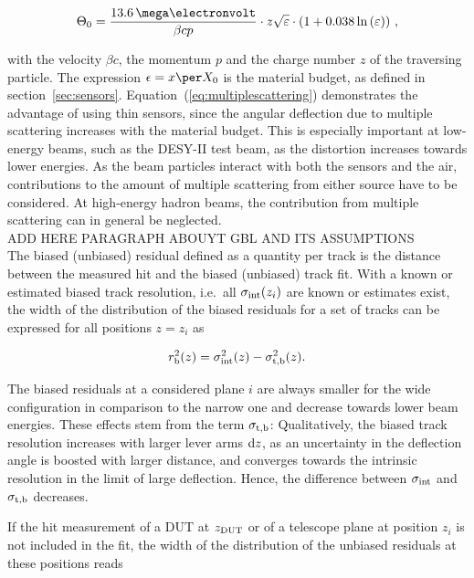 \begin{equation}
\label{eq:multiplescattering}
\Theta_{0} = \frac{13.6\,\mega\electronvolt}{\beta c p} \cdot z
\sqrt{\varepsilon}
\cdot \left( 1 + 0.038 \ln{\left( \varepsilon \right) } \right) \,,
\end{equation}

\noindent with the velocity $\beta c$, the momentum $p$ and the charge number $z$ of the traversing particle. 
The expression $\epsilon = x \per X_0$ is the material budget, as defined in section~\ref{sec:sensors}.
Equation~(\ref{eq:multiplescattering}) demonstrates the advantage of using thin sensors, since the angular deflection due to multiple scattering increases with the material budget.
This is especially important at low-energy beams, such as the DESY-II test beam, as the distortion increases towards lower energies.
As the beam particles interact with both the sensors and the air, contributions to the amount of multiple scattering from either source have to be considered.
At high-energy hadron beams, the contribution from multiple scattering can in general be neglected. \\

ADD HERE PARAGRAPH ABOUYT GBL AND ITS ASSUMPTIONS\\

The biased (unbiased) residual defined as a quantity per track is the distance between the measured hit and the biased (unbiased) track fit. 
With a known or estimated biased track resolution, i.e.\ all $\sigma_{\textrm{int}}(z_i)$ are known or estimates exist,
 the width of the distribution of the biased residuals for a set of tracks can be expressed for all positions $z = z_i$ as

\begin{equation}
 \label{eq:telescoperesolutionequation1}
 r_{\textrm{b}}^2(z) = \sigma_{\textrm{int}}^2(z) - \sigma_{\textrm{t,b}}^2(z).
\end{equation}

\noindent
The biased residuals at a considered plane $i$ are always smaller for the wide configuration in comparison to the narrow one and decrease towards lower beam energies. 
These effects stem from the term $\sigma_{\textrm{t,b}}$: 
Qualitatively, the biased track resolution increases with larger lever arms $\textrm{d}z$, as an uncertainty in the deflection angle is boosted with larger distance,
 and converges towards the intrinsic resolution in the limit of large deflection. 
Hence, the difference between $\sigma_{\textrm{int}}$ and $\sigma_{\textrm{t,b}}$ decreases. 

If the hit measurement of a DUT at $z_{\textrm{DUT}}$ or of a telescope plane at position $z_i$ is not included in the fit,
 the width of the distribution of the unbiased residuals at these positions reads~\cite{ref:eudetreport200902}
 
